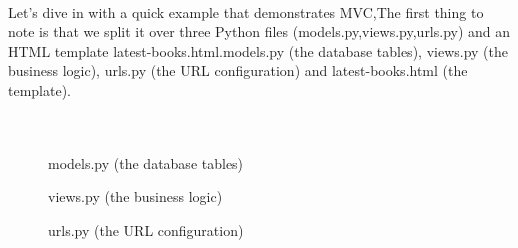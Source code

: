 \documentclass[12pt,a4paper,class,twoside,openany]{report}
\begin{document}
\paragraph*{\hspace{.9 cm} } Let's dive in with a quick example that demonstrates MVC,The first thing to note is that we split it over three Python files
(models.py,views.py,urls.py) and an HTML template latest-books.html.models.py (the database tables), views.py (the business logic), urls.py (the URL configuration) and latest-books.html (the template).\\ \\ \\
 \begin{figure}
\begin{center}
\caption{models.py (the database tables)}
\label{fg:3-5}
\end{center}
\end{figure}
 
\begin{figure}
\begin{center}
\caption{views.py (the business logic)}
\label{fg:3-6}
\end{center}
\end{figure}

 \begin{figure}
\begin{center}
\caption{urls.py (the URL configuration)}
\label{fg:3-7}
\end{center}
\end{figure}
\end{document}

